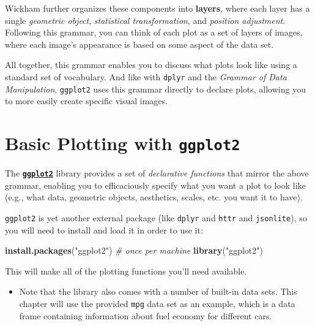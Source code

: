 \documentclass[]{book}
\newenvironment{Shaded}{\begin{snugshade}}{\end{snugshade}}
\newcommand{\KeywordTok}[1]{\textcolor[rgb]{0.13,0.29,0.53}{\textbf{#1}}}
\newcommand{\StringTok}[1]{\textcolor[rgb]{0.31,0.60,0.02}{#1}}
\newcommand{\CommentTok}[1]{\textcolor[rgb]{0.56,0.35,0.01}{\textit{#1}}}
\newcommand{\NormalTok}[1]{#1}
\providecommand{\tightlist}{%
  \setlength{\itemsep}{0pt}\setlength{\parskip}{0pt}}
\theoremstyle{definition}
\theoremstyle{definition}
\theoremstyle{remark}
\begin{document}
Wickham further organizes these components into \textbf{layers}, where
each layer has a single \emph{geometric object}, \emph{statistical
transformation}, and \emph{position adjustment}. Following this grammar,
you can think of each plot as a set of layers of images, where each
image's appearance is based on some aspect of the data set.

All together, this grammar enables you to discuss what plots look like
using a standard set of vocabulary. And like with \texttt{dplyr} and the
\emph{Grammar of Data Manipulation}, \texttt{ggplot2} uses this grammar
directly to declare plots, allowing you to more easily create specific
visual images.

\section{\texorpdfstring{Basic Plotting with
\texttt{ggplot2}}{Basic Plotting with ggplot2}}\label{basic-plotting-with-ggplot2}

The \href{http://ggplot2.tidyverse.org/}{\textbf{\texttt{ggplot2}}}
library provides a set of \emph{declarative functions} that mirror the
above grammar, enabling you to efficaciously specify what you want a
plot to look like (e.g., what data, geometric objects, aesthetics,
scales, etc. you want it to have).

\texttt{ggplot2} is yet another external package (like \texttt{dplyr}
and \texttt{httr} and \texttt{jsonlite}), so you will need to install
and load it in order to use it:

\begin{Shaded}
\begin{Highlighting}[]
\KeywordTok{install.packages}\NormalTok{(}\StringTok{"ggplot2"}\NormalTok{)  }\CommentTok{# once per machine}
\KeywordTok{library}\NormalTok{(}\StringTok{"ggplot2"}\NormalTok{)}
\end{Highlighting}
\end{Shaded}

This will make all of the plotting functions you'll need available.

\begin{itemize}
\tightlist
\item
  Note that the library also comes with a number of built-in data sets.
  This chapter will use the provided \texttt{mpg} data set as an
  example, which is a data frame containing information about fuel
  economy for different cars.
\end{itemize}
\end{document}
